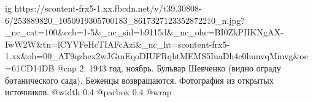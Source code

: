  
 
 
 
 

\ifcmt
  ig https://scontent-frx5-1.xx.fbcdn.net/v/t39.30808-6/253889820_1050919305700183_8617327123352872210_n.jpg?_nc_cat=100&ccb=1-5&_nc_sid=b9115d&_nc_ohc=BI0ZkPIIKNgAX-IwW2W&tn=lCYVFeHcTIAFcAzi&_nc_ht=scontent-frx5-1.xx&oh=00_AT9qzhex2wJGmEqoDIUFRqhtMEMS5IuaDh4c0hunvqMmvg&oe=61CD14DB
  @cap 2. 1943 год, ноябрь. Бульвар Шевченко (видно ограду ботанического сада). Беженцы возвращаются. Фотография из открытых источников. 
  @width 0.4
  @parbox 0.4
  @wrap \parpic[l]
\fi
